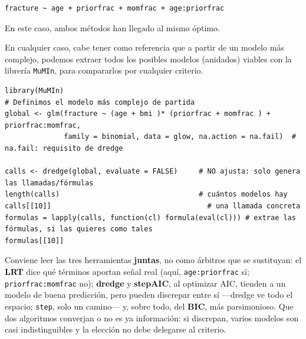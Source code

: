 \documentclass[
  letterpaper,
  DIV=11,
  numbers=noendperiod]{scrartcl}
\begin{document}
\begin{verbatim}
fracture ~ age + priorfrac + momfrac + age:priorfrac
\end{verbatim}

En este caso, ambos métodos han llegado al mismo óptimo.

\begin{tcolorbox}[enhanced jigsaw, coltitle=black, rightrule=.15mm, arc=.35mm, leftrule=.75mm, colback=white, colbacktitle=quarto-callout-tip-color!10!white, left=2mm, breakable, toptitle=1mm, toprule=.15mm, bottomtitle=1mm, titlerule=0mm, title=\textcolor{quarto-callout-tip-color}{\faLightbulb}\hspace{0.5em}{🔧 En R. Generar modelos anidados con \texttt{MuMIn} (\texttt{dredge})}, bottomrule=.15mm, opacityback=0, opacitybacktitle=0.6, colframe=quarto-callout-tip-color-frame]

En cualquier caso, cabe tener como referencia que a partir de un modelo
más complejo, podemos extraer todos los posibles modelos (anidados)
viables con la librería \texttt{MuMIn}, para compararlos por cualquier
criterio.

\begin{verbatim}
library(MuMIn)
# Definimos el modelo más complejo de partida
global <- glm(fracture ~ (age + bmi )* (priorfrac + momfrac ) + priorfrac:momfrac,
              family = binomial, data = glow, na.action = na.fail)  # na.fail: requisito de dredge

calls <- dredge(global, evaluate = FALSE)     # NO ajusta: solo genera las llamadas/fórmulas
length(calls)                                 # cuántos modelos hay
calls[[10]]                                     # una llamada concreta
formulas = lapply(calls, function(cl) formula(eval(cl))) # extrae las fórmulas, si las quieres como tales
formulas[[10]]
\end{verbatim}

\end{tcolorbox}

Conviene leer las tres herramientas \textbf{juntas}, no como árbitros
que se sustituyan: el \textbf{LRT} dice qué términos aportan señal real
(aquí, \texttt{age:priorfrac} sí; \texttt{priorfrac:momfrac} no);
\textbf{dredge} y \textbf{stepAIC}, al optimizar AIC, tienden a un
modelo de buena predicción, pero pueden discrepar entre sí ---dredge ve
todo el espacio; \texttt{step}, solo un camino--- y, sobre todo, del
\textbf{BIC}, más parsimonioso. Que dos algoritmos converjan o no es ya
información: si discrepan, varios modelos son casi indistinguibles y la
elección no debe delegarse al criterio.
\end{document}
